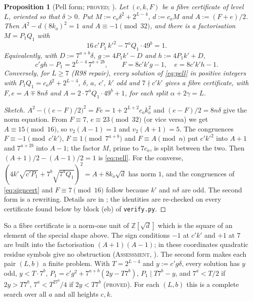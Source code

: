\documentclass[11pt,reqno]{amsart}
\newtheorem{proposition}[theorem]{Proposition}
\theoremstyle{definition}
\newcommand{\Z}{\mathbb Z}
\newcommand{\status}[1]{\textup{\textsc{#1}}}
\begin{document}
\begin{proposition}[Pell form; \status{proved}; {\cite[Prop.~1.2, Cor.~1.4]{PT4}}]\label{prop:pell}
Let $(c,k,F)$ be a fibre certificate of level $L$, oriented so that
$\delta>0$.  Put $M:=c_o\delta^2+2^{L-4}$, $d:=c_oM$ and $A:=(F+e)/2$.
Then $A^2-d\,(8k_o)^2=1$ and $A\equiv-1\pmod{32}$, and there is a
factorisation $M=P_1Q_1$ with
\begin{equation}\label{eq:pell}
16\,c'P_1\,k'^2-7^aQ_1\cdot49^{b}=1 .
\end{equation}
Equivalently, with $D:=7^{a+b}\delta$, $g:=4P_1k'-D$ and $h:=4P_1k'+D$,
\[
c'gh-P_1=2^{L-4}\,7^{a+2b},\qquad F=8c'k'g-1,\quad e=8c'k'h-1 .
\]
Conversely, for $L\ge7$ (R98 repair), every solution of \eqref{eq:pell} in positive integers with
$P_1Q_1=c_o\delta^2+2^{L-4}$, $\delta$, $a$, $c'$, $k'$ odd and
$7\nmid c'k'$ gives a fibre certificate, with $F,e=A\mp8n\delta$ and
$A=2\cdot7^aQ_1\cdot49^b+1$, for each split $\alpha+2\gamma=L$.
\end{proposition}

\begin{proof}[Sketch]
$A^2-\bigl((e-F)/2\bigr)^2=Fe=1+2^{L+2}c_ok_o^2$ and $(e-F)/2=8n\delta$
give the norm equation.  From $F\equiv7$, $e\equiv23\pmod{32}$ (or vice
versa) we get $A\equiv15\pmod{16}$, so $v_2(A-1)=1$ and $v_2(A+1)=5$.
The congruences $F\equiv-1\pmod{c'k'}$, $F\equiv1\pmod{7^{a+b}}$ and
$F\equiv A\pmod n$ put $c'k'^2$ into $A+1$ and $7^{a+2b}$ into $A-1$; the
factor $M$, prime to $7c_o$, is split between the two.  Then
$(A+1)/2-(A-1)/2=1$ is \eqref{eq:pell}.  For the converse,
$(4k'\sqrt{c'P_1}+7^b\sqrt{7^aQ_1})^2=A+8k_o\sqrt d$ has norm $1$, and
the congruences of \eqref{eq:signcert} and $F\equiv7\pmod{16}$ follow
because $k'$ and $n\delta$ are odd.  The second form is a rewriting.
Details are in \cite[\S1]{PT4}; the identities are re-checked on every
certificate found below by block (eb) of \texttt{verify.py}.
\end{proof}

So a fibre certificate is a norm-one unit of $\Z[\sqrt d]$ which is the
square of an element of the special shape above.  The sign conditions
$-1$ at $c'k'$ and $+1$ at $7$ are built into the factorisation
$(A+1)(A-1)$; in these coordinates quadratic residue symbols give no
obstruction (\status{Assessment}, \cite[\S4]{PT4}).  The second form makes
each pair $(L,b)$ a finite problem.  With $T=2^{L-4}$ and $y:=c'g\delta$,
every solution has $y$ odd, $y<T\cdot7^b$,
$P_1=c'g^2+7^{a+b}(2y-T7^b)$, $P_1\mid T7^b-y$, and $7^a<T/2$ if
$2y>T7^b$, $7^a<T^27^b/4$ if $2y<T7^b$ \cite[Lemma~3.1, Cor.~3.2]{PT4}
(\status{proved}).  For each $(L,b)$ this is a complete search over all
$a$ and all heights $c,k$.
\end{document}
